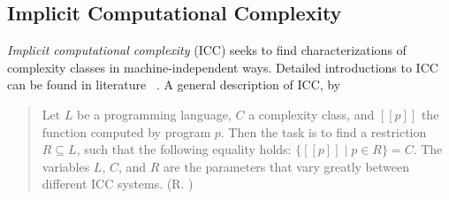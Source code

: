 \subsection{Implicit Computational Complexity}\label{subsec:icc}

\textit{Implicit computational complexity} (ICC) seeks to find
characterizations of complexity classes in machine-independent ways.
Detailed introductions to ICC can be found in literature
~\cite{dallago2012,moyen2017,pechoux2020,dallago2022}.
A general description of ICC, by

\begin{quote}
Let $L$ be a programming language, $C$ a complexity class, and $[\![ p ]\!]$ the function computed by program $p$.
Then the task is to find a restriction $R \subseteq L$, such that the following equality holds: $\{ [\![ p ]\!] \; \vert \; p \in R \} = C$.
The variables $L$, $C$, and $R$ are the parameters that vary greatly between different ICC systems. \hfill (R. )
\end{quote}